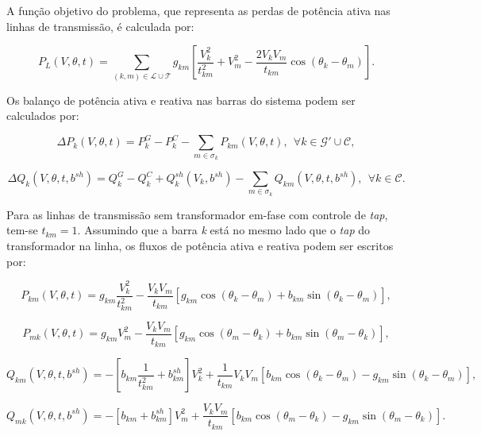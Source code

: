 \documentclass[
	12pt,				%
	openany,			%
	twoside,			%
	a4paper,			%
	chapter=TITLE,		%
	section=Title,		%
	subsection=Title,	%
	subsubsection=Title,%
	english,			%
	french,				%
	spanish,			%
	brazil			%
	]{abntex2}
\begin{document}
\begin{ERRATA}
A função objetivo do problema, que representa as perdas de potência ativa nas linhas de transmissão, é calculada por:

\begin{equation} \label{função objetivo}
P_L(V,\theta,t) = \sum_{(k, m) \in \mathcal{L} \cup \mathcal{T}} g_{km} \left[\frac{V_{k}^2}{t^{2}_{km}}+V_{m}^2-\frac{2V_kV_m}{t_{km}}\cos (\theta_{k}-\theta_{m})\right].
\end{equation}

Os balanço de potência ativa e reativa nas barras do sistema podem ser calculados por:

\begin{equation} \label{pot ativa}
\Delta P_k(V,\theta,t) = P^G_k - P^C_k  - \sum_{m \in \mathcal{\sigma}_k}P_{km}(V,\theta,t), \ \ \forall k \in \mathcal{G}' \cup \mathcal{C}, 
\end{equation}

\begin{equation} \label{pot reativa}
\Delta Q_k(V,\theta,t, b^{sh}) = Q^G_k - Q^C_k + Q_k^{sh}(V_k,b^{sh}) - \sum_{m \in \mathcal{\sigma}_k}Q_{km}(V,\theta,t, b^{sh}), \ \  \forall k \in \mathcal{C}.
\end{equation}

Para as linhas de transmissão sem transformador em-fase com controle de \emph{tap}, tem-se $t_{km} = 1$. Assumindo que a barra \emph{k} está no mesmo lado que o \emph{tap} do transformador na linha, os fluxos de potência ativa e reativa podem ser escritos por:

\begin{equation} \label{fpkm}
P_{km}(V,\theta,t) = g_{km}\frac{V_{k}^2}{t^{2}_{km}} - \frac{V_{k}V_{m}}{t_{km}} \left[g_{km}\cos(\theta_{k}-\theta_{m}) + b_{km}\sin(\theta_{k}-\theta_{m})\right],
\end{equation}

\begin{equation} \label{fpmk}
P_{mk}(V,\theta,t) = g_{km}V_{m}^2 - \frac{V_{k}V_{m}}{t_{km}}[g_{km}\cos(\theta_{m}-\theta_{k}) + b_{km}\sin(\theta_{m}-\theta_{k})],
\end{equation}

\begin{equation} \label{fqkm}
Q_{km}(V,\theta,t,b^{sh}) = -\left [b_{km}\frac{1}{t^{2}_{km}}+b_{km}^{sh}\right] V_{k}^2 + \frac{1}{t_{km}}V_{k}V_{m}[b_{km}\cos(\theta_{k}-\theta_{m}) - g_{km}\sin(\theta_{k}-\theta_{m})],
\end{equation}

\begin{equation} \label{fqmk}
Q_{mk}(V,\theta,t,b^{sh}) = -\left [b_{km}+b_{km}^{sh}\right]V_{m}^2 + \frac{V_{k}V_{m}}{t_{km}}[b_{km}\cos(\theta_{m}-\theta_{k}) - g_{km}\sin(\theta_{m}-\theta_{k})].
\end{equation}


\end{ERRATA}
\end{document}
